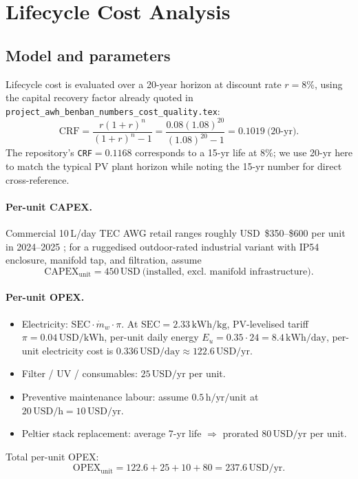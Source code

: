 \documentclass[11pt,a4paper]{article}
\newcommand{\SI}[2]{#1\,\ensuremath{\mathrm{#2}}}
\providecommand{\kilowatt}{kW}
\providecommand{\hour}{h}
\providecommand{\day}{day}
\providecommand{\year}{yr}
\providecommand{\kilogram}{kg}
\begin{document}
\section{Lifecycle Cost Analysis}
\label{sec:lcc}

\subsection{Model and parameters}
Lifecycle cost is evaluated over a 20-year horizon at discount rate $r{=}8\%$, using the capital recovery factor already quoted in \texttt{project\_awh\_benban\_numbers\_cost\_quality.tex}:
\begin{equation}
\mathrm{CRF} = \frac{r(1+r)^n}{(1+r)^n-1} = \frac{0.08(1.08)^{20}}{(1.08)^{20}-1} = 0.1019 \ \text{(20-yr)}.
\end{equation}
The repository's \texttt{CRF}${=}0.1168$ corresponds to a 15-yr life at 8\%; we use 20-yr here to match the typical PV plant horizon while noting the 15-yr number for direct cross-reference.

\paragraph{Per-unit CAPEX.} Commercial 10\,L/day TEC AWG retail ranges roughly USD~\$350--\$600 per unit in 2024--2025 \citep{ecoloblue2024,commercial_awg_retail_2025}; for a ruggedised outdoor-rated industrial variant with IP54 enclosure, manifold tap, and filtration, assume
\begin{equation}
\mathrm{CAPEX}_{\mathrm{unit}} = \SI{450}{USD}\ \text{(installed, excl.\ manifold infrastructure).}
\end{equation}

\paragraph{Per-unit OPEX.}
\begin{itemize}[leftmargin=*]
  \item Electricity: $\mathrm{SEC}{\cdot}\dot{m}_w{\cdot}\pi$. At $\mathrm{SEC}{=}\SI{2.33}{\kilowatt\hour/\kilogram}$, PV-levelised tariff $\pi{=}\SI{0.04}{USD/\kilowatt\hour}$, per-unit daily energy $E_u{=}0.35\cdot 24{=}8.4\,\mathrm{kWh/day}$, per-unit electricity cost is $\SI{0.336}{USD/\day} \approx \SI{122.6}{USD/\year}$.
  \item Filter / UV / consumables: $\SI{25}{USD/\year}$ per unit.
  \item Preventive maintenance labour: assume $\SI{0.5}{\hour/\year/\text{unit}}$ at $\SI{20}{USD/\hour} = \SI{10}{USD/\year}$.
  \item Peltier stack replacement: average 7-yr life $\Rightarrow$ prorated $\SI{80}{USD/\year}$ per unit.
\end{itemize}
Total per-unit OPEX:
\begin{equation}
\mathrm{OPEX}_{\mathrm{unit}} = 122.6 + 25 + 10 + 80 = \SI{237.6}{USD/\year}.
\end{equation}
\end{document}
